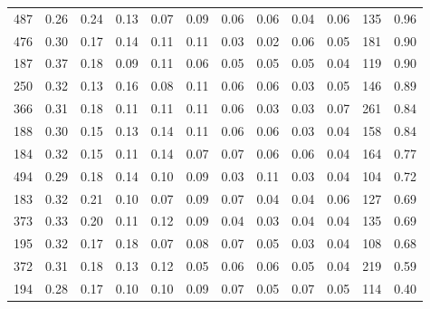 \begin{tabular}{rrrrrrrrrrll}
          487 & 0.26 & 0.24 & 0.13 & 0.07 & 0.09 & 0.06 & 0.06 & 0.04 & 0.06 & 135 &  0.96 \\
          476 & 0.30 & 0.17 & 0.14 & 0.11 & 0.11 & 0.03 & 0.02 & 0.06 & 0.05 & 181 &  0.90 \\
          187 & 0.37 & 0.18 & 0.09 & 0.11 & 0.06 & 0.05 & 0.05 & 0.05 & 0.04 & 119 &  0.90 \\
          250 & 0.32 & 0.13 & 0.16 & 0.08 & 0.11 & 0.06 & 0.06 & 0.03 & 0.05 & 146 &  0.89 \\
          366 & 0.31 & 0.18 & 0.11 & 0.11 & 0.11 & 0.06 & 0.03 & 0.03 & 0.07 & 261 &  0.84 \\
          188 & 0.30 & 0.15 & 0.13 & 0.14 & 0.11 & 0.06 & 0.06 & 0.03 & 0.04 & 158 &  0.84 \\
          184 & 0.32 & 0.15 & 0.11 & 0.14 & 0.07 & 0.07 & 0.06 & 0.06 & 0.04 & 164 &  0.77 \\
          494 & 0.29 & 0.18 & 0.14 & 0.10 & 0.09 & 0.03 & 0.11 & 0.03 & 0.04 & 104 &  0.72 \\
          183 & 0.32 & 0.21 & 0.10 & 0.07 & 0.09 & 0.07 & 0.04 & 0.04 & 0.06 & 127 &  0.69 \\
          373 & 0.33 & 0.20 & 0.11 & 0.12 & 0.09 & 0.04 & 0.03 & 0.04 & 0.04 & 135 &  0.69 \\
          195 & 0.32 & 0.17 & 0.18 & 0.07 & 0.08 & 0.07 & 0.05 & 0.03 & 0.04 & 108 &  0.68 \\
          372 & 0.31 & 0.18 & 0.13 & 0.12 & 0.05 & 0.06 & 0.06 & 0.05 & 0.04 & 219 &  0.59 \\
          194 & 0.28 & 0.17 & 0.10 & 0.10 & 0.09 & 0.07 & 0.05 & 0.07 & 0.05 & 114 &  0.40 \\
\bottomrule
\end{tabular}
